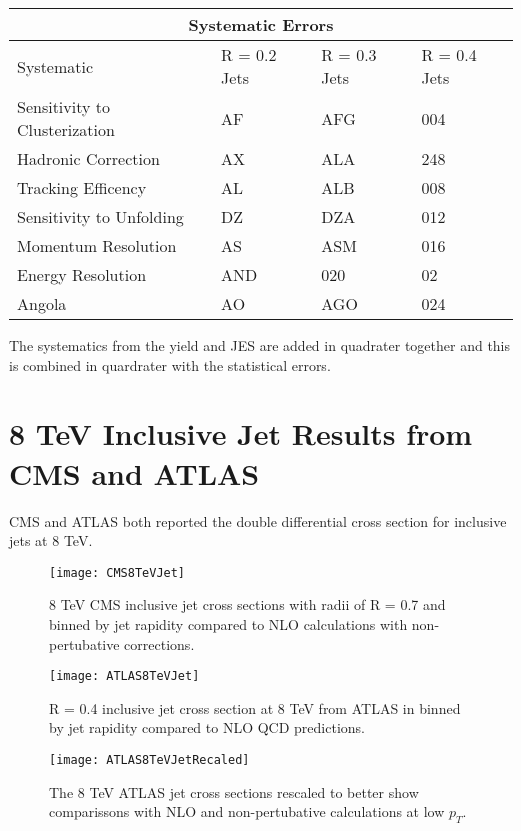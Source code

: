 \begin{tabular}{ |p{5cm}||p{3cm}|p{3cm}|p{3cm}|  }
 \hline
 \multicolumn{4}{|c|}{Systematic Errors} \\
 \hline
 Systematic &R = 0.2 Jets & R = 0.3 Jets& R = 0.4 Jets\\
 \hline
Sensitivity to Clusterization   & AF    &AFG&   004\\
Hadronic Correction&   AX  & ALA   &248\\
Tracking Efficency &AL & ALB&  008\\
Sensitivity to Unfolding&DZ & DZA&  012\\
Momentum Resolution&   AS  & ASM&016\\
Energy Resolution& AND   &020 & 02\\
 Angola& AO  & AGO&024\\
 \hline

\end{tabular}
\noindent

The systematics from the yield and JES are added in quadrater together and this is combined in quardrater with the statistical errors.

\section{8 TeV Inclusive Jet Results from CMS and ATLAS}

CMS\cite{CMS:2013kda} and ATLAS\cite{Aaboud:2017dvo} both reported the double differential cross section for inclusive jets at 8 TeV.  

\begin{figure}[h]
\texttt{[image: CMS8TeVJet]}
\centering
\caption{8 TeV CMS inclusive jet cross sections with radii of R = 0.7 and binned by jet rapidity compared to NLO calculations with non-pertubative corrections\cite{CMS:2013kda}.}
\label{fig:CMS8TeVRescale}
\end{figure}

\begin{figure}[h]
\texttt{[image: ATLAS8TeVJet]}
\centering
\caption{R = 0.4 inclusive jet cross section at 8 TeV from ATLAS in binned by jet rapidity compared to NLO QCD predictions\cite{Aaboud:2017dvo}.}
\label{fig:ATLAS8TeV}
\end{figure}

\begin{figure}[h]
\texttt{[image: ATLAS8TeVJetRecaled]}
\centering
\caption{The 8 TeV ATLAS jet cross sections rescaled to better show comparissons with NLO and non-pertubative calculations at low $p_{T}$\cite{Aaboud:2017dvo}.}
\label{fig:ATLAS8TeVRescale}
\end{figure}

